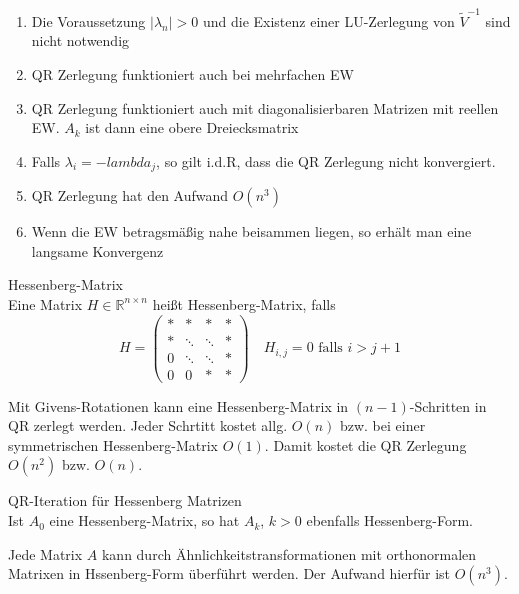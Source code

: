 \begin{remark}
	\begin{enumerate}
		\item Die Voraussetzung $|\lambda_{n}|>0$ und die Existenz einer LU-Zerlegung von $\tilde V^{-1}$ sind nicht notwendig
		\item QR Zerlegung funktioniert auch bei mehrfachen EW
		\item QR Zerlegung funktioniert auch mit diagonalisierbaren Matrizen mit reellen EW. $A_{k}$  ist dann eine obere Dreiecksmatrix
		\item Falls $\lambda_{i}=-lambda_{j}$, so gilt i.d.R, dass die QR Zerlegung nicht konvergiert.
		\item QR Zerlegung hat den Aufwand $O(n^{3})$
		\item Wenn die EW betragsmäßig nahe beisammen liegen, so erhält man eine langsame Konvergenz
	\end{enumerate}
\end{remark}

\begin{definition}
	[Definition II.1] Hessenberg-Matrix
	\\
	Eine Matrix $H\in \mathbb{R}^{n\times n}$ heißt Hessenberg-Matrix, falls
	$$ H = \left(
	\begin{array}{cccc}
	*&*&*&*\\
	*&\ddots&\ddots&*\\
	0 & \ddots& \ddots & *\\
	0 & 0 & * & *
	\end{array}\right)\quad H_{i,j}=0 \text{ falls } i>j+1$$
\end{definition}

Mit Givens-Rotationen kann eine Hessenberg-Matrix in $(n-1)$-Schritten in QR zerlegt werden. Jeder Schrtitt kostet allg. $O(n)$ bzw. bei
einer symmetrischen Hessenberg-Matrix $O(1)$. Damit kostet die QR Zerlegung $O(n^{2})$ bzw. $O(n)$.

\begin{theorem}
	[Satz II.4] QR-Iteration für Hessenberg Matrizen
	\\
	Ist $A_{0}$ eine Hessenberg-Matrix, so hat $A_{k}$, $k>0$ ebenfalls Hessenberg-Form.
\end{theorem}

\begin{theorem}
	[Satz II.5] Jede Matrix $A$ kann durch Ähnlichkeitstransformationen mit orthonormalen Matrixen in Hssenberg-Form überführt werden.
	Der Aufwand hierfür ist $O(n^{3})$.
\end{theorem}

